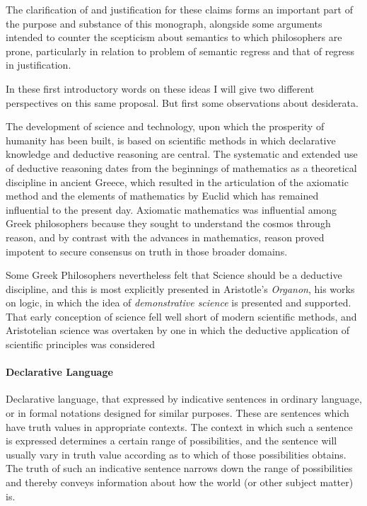 The clarification of and justification for these claims forms an important part of the purpose and substance of this monograph, alongside some arguments intended to counter the scepticism about semantics to which philosophers are prone, particularly in relation to problem of semantic regress and that of regress in justification.

In these first introductory words on these ideas I will give two different perspectives on this same proposal.
But first some observations about desiderata.

The development of science and technology, upon which the prosperity of humanity has been built, is based on scientific methods in which declarative knowledge and deductive reasoning are central.
The systematic and extended use of deductive reasoning dates from the beginnings of mathematics as a theoretical discipline in ancient Greece, which resulted in the articulation of the axiomatic method and the elements of mathematics by Euclid which has remained influential to the present day.
Axiomatic mathematics was influential among Greek philosophers because they sought to understand the cosmos through reason, and by contrast with the advances in mathematics, reason proved impotent to secure consensus on truth in those broader domains.

Some Greek Philosophers nevertheless felt that Science should be a deductive discipline, and this is most explicitly presented in Aristotle's \emph{Organon}, his works on logic, in which the idea of \emph{demonstrative science} is presented and supported.
That early conception of science fell well short of modern scientific methods, and Aristotelian science was overtaken by one in which the deductive application of scientific principles was considered 

\paragraph{Declarative Language}

Declarative language, that expressed by indicative sentences in ordinary language, or in formal notations designed for similar purposes.
These are sentences which have truth values in appropriate contexts.
The context in which such a sentence is expressed determines a certain range of possibilities, and the sentence will usually vary in truth value according as to which of those possibilities obtains.
The truth of such an indicative sentence narrows down the range of possibilities and thereby conveys information about how the world (or other subject matter) is.

